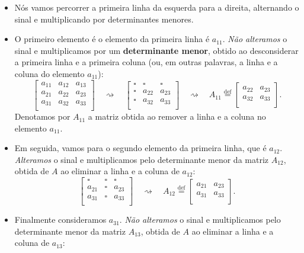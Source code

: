 \documentclass[../livro.tex]{subfiles}  %
\begin{document}
\begin{itemize}
\item Nós vamos percorrer a primeira linha da esquerda para a direita, alternando o sinal e multiplicando por determinantes menores.
\item O primeiro elemento é o elemento da primeira linha é $a_{11}$. \textit{Não alteramos} o sinal e multiplicamos por um \textbf{determinante menor}, obtido ao desconsiderar a primeira linha e a primeira coluna (ou, em outras palavras, a linha e a coluna do elemento $a_{11}$):
\[
\begin{bmatrix}
a_{11} & a_{12} & a_{13} \\
a_{21} & a_{22} & a_{23} \\
a_{31} & a_{32} & a_{33} \\
\end{bmatrix} \quad \rightsquigarrow \quad 
\begin{bmatrix}
\square & \square & \square \\
\square & a_{22}  & a_{23} \\
\square & a_{32}  & a_{33} \\
\end{bmatrix} \quad \rightsquigarrow \quad A_{11} \stackrel{\text{def}}{=} 
\begin{bmatrix}
a_{22}  & a_{23} \\
a_{32}  & a_{33} \\
\end{bmatrix}.
\] Denotamos por $A_{11}$ a matriz obtida ao remover a linha e a coluna no elemento $a_{11}$.
\item Em seguida, vamos para o segundo elemento da primeira linha, que é $a_{12}$. \textit{Alteramos} o sinal e multiplicamos pelo determinante menor da matriz $A_{12}$, obtida de $A$ ao eliminar a linha e a coluna de $a_{12}$:
\[
\begin{bmatrix}
\square & \square & \square \\
a_{21}  & \square & a_{23} \\
a_{31}  & \square & a_{33} \\
\end{bmatrix} \quad \rightsquigarrow \quad A_{12} \stackrel{\text{def}}{=} 
\begin{bmatrix}
a_{21}  & a_{23} \\
a_{31}  & a_{33} \\
\end{bmatrix}.
\]
\item Finalmente consideramos $a_{31}$. \textit{Não alteramos} o sinal e multiplicamos pelo determinante menor da matriz $A_{13}$, obtida de $A$ ao eliminar a linha e a coluna de $a_{13}$:

\end{itemize}
\end{document}
